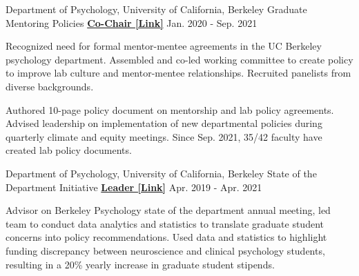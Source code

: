 \begin{cventries}
  \cventry 
    {Department of Psychology, University of California, Berkeley} %
    {Graduate Mentoring Policies}
    {\href{http://ivrylab.berkeley.edu/uploads/4/1/1/5/41152143/cognac_lab_policies_19feb2021.pdf}{\textbf{Co-Chair [Link]}}} %
    {Jan. 2020 - Sep. 2021} %
    {
      \begin{cvitems} %
        \item {Recognized need for formal mentor-mentee agreements in the UC Berkeley psychology department. Assembled and co-led working committee to create policy to improve lab culture and mentor-mentee relationships. Recruited panelists from diverse backgrounds.}
        \item {Authored 10-page policy document on mentorship and lab policy agreements. Advised leadership on implementation of new departmental policies during quarterly climate and equity meetings. Since Sep. 2021, 35/42 faculty have created lab policy documents.}
      \end{cvitems}
    }
    
    
  \cventry 
    {Department of Psychology, University of California, Berkeley} %
    {State of the Department Initiative}
    {\href{https://drive.google.com/file/d/1wD7y5gW39EU4vQUyhcrO7Fra1Ttc_HyG/view?usp=sharing}{\textbf{Leader [Link]}}} %
    {Apr. 2019 - Apr. 2021} %
    {
      \begin{cvitems} %
      	\item {Advisor on Berkeley Psychology state of the department annual meeting, led team to conduct data analytics and statistics to translate graduate student concerns into policy recommendations. Used data and statistics to highlight funding discrepancy between neuroscience and clinical psychology students, resulting in a 20\% yearly increase in graduate student stipends.}
      \end{cvitems}
    }
 
\end{cventries}